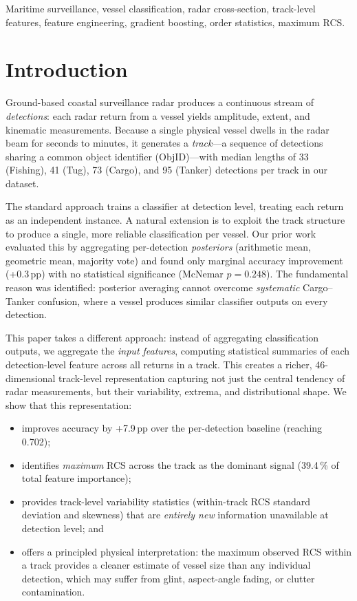\documentclass[10pt,journal,compsoc]{IEEEtran}
\begin{document}
\begin{IEEEkeywords}
Maritime surveillance, vessel classification, radar cross-section, track-level
features, feature engineering, gradient boosting, order statistics, maximum RCS.
\end{IEEEkeywords}

\section{Introduction}\label{sec:intro}

Ground-based coastal surveillance radar produces a continuous stream of
\emph{detections}: each radar return from a vessel yields amplitude,
extent, and kinematic measurements.  Because a single physical vessel
dwells in the radar beam for seconds to minutes, it generates a
\emph{track}---a sequence of detections sharing a common object identifier
(ObjID)---with median lengths of 33 (Fishing), 41 (Tug),
73 (Cargo), and 95 (Tanker) detections per track in our dataset.

The standard approach trains a classifier at detection level, treating each return
as an independent instance.  A natural extension is to exploit the track structure
to produce a single, more reliable classification per vessel.  Our prior work
\cite{paper7_arith} evaluated this by aggregating per-detection \emph{posteriors}
(arithmetic mean, geometric mean, majority vote) and found only marginal accuracy
improvement (+0.3\,pp) with no statistical significance (McNemar $p=0.248$).
The fundamental reason was identified: posterior averaging cannot overcome
\emph{systematic} Cargo--Tanker confusion, where a vessel produces similar
classifier outputs on every detection.

This paper takes a different approach: instead of aggregating classification
outputs, we aggregate the \emph{input features}, computing statistical summaries
of each detection-level feature across all returns in a track.  This creates a
richer, 46-dimensional track-level representation capturing not just the central
tendency of radar measurements, but their variability, extrema, and distributional
shape.  We show that this representation:
\begin{itemize}
\item improves accuracy by +7.9\,pp over the per-detection baseline
      (reaching 0.702);
\item identifies \emph{maximum} RCS across the track as the dominant signal
      (39.4\,\% of total feature importance);
\item provides track-level variability statistics (within-track RCS standard
      deviation and skewness) that are \emph{entirely new} information
      unavailable at detection level; and
\item offers a principled physical interpretation: the maximum observed RCS
      within a track provides a cleaner estimate of vessel size than any
      individual detection, which may suffer from glint, aspect-angle fading,
      or clutter contamination.
\end{itemize}
\end{document}
